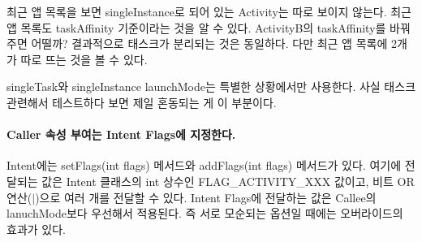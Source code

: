 \begin{itemize}
최근 앱 목록을 보면 singleInstance로 되어 있는 Activity는 따로 보이지 않는다. 최근 앱 목록도 taskAffinity 기준이라는 것을 알 수 있다.
ActivityB의 taskAffinity를 바꿔주면 어떨까? 결과적으로 태스크가 분리되는 것은 동일하다. 다만 최근 앱 목록에 2개가 따로 뜨는 것을 볼 수 있다.
\end{itemize}

singleTask와 singleInstance launchMode는 특별한 상황에서만 사용한다. 사실 태스크 관련해서 테스트하다 보면 제일 혼동되는 게 이 부분이다.

\paragraph{Caller 속성 부여는 Intent Flags에 지정한다.}
Intent에는 setFlags(int flags) 메서드와 addFlags\-(int flags) 메서드가 있다. 여기에 전달되는 값은 Intent 클래스의 int 상수인 FLAG\_ACTIVITY\_\-XXX 값이고, 비트 OR 연산($|$)으로 여러 개를 전달할 수 있다. 
Intent Flags에 전달하는 값은 Callee의 lanuchMode보다 우선해서 적용된다. 즉 서로 모순되는 옵션일 때에는 오버라이드의 효과가 있다.

